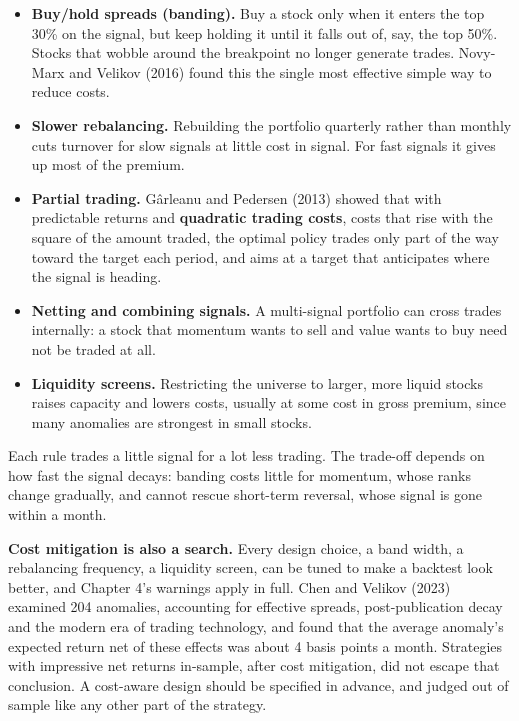 \begin{itemize}
  \item \textbf{Buy/hold spreads (banding).} Buy a stock only when it enters the top 30\% on the signal, but keep holding it until it falls out of, say, the top 50\%. Stocks that wobble around the breakpoint no longer generate trades. Novy-Marx and Velikov (2016) found this the single most effective simple way to reduce costs.
  \item \textbf{Slower rebalancing.} Rebuilding the portfolio quarterly rather than monthly cuts turnover for slow signals at little cost in signal. For fast signals it gives up most of the premium.
  \item \textbf{Partial trading.} G\^arleanu and Pedersen (2013) showed that with predictable returns and \textbf{quadratic trading costs}, costs that rise with the square of the amount traded, the optimal policy trades only part of the way toward the target each period, and aims at a target that anticipates where the signal is heading.
  \item \textbf{Netting and combining signals.} A multi-signal portfolio can cross trades internally: a stock that momentum wants to sell and value wants to buy need not be traded at all.
  \item \textbf{Liquidity screens.} Restricting the universe to larger, more liquid stocks raises capacity and lowers costs, usually at some cost in gross premium, since many anomalies are strongest in small stocks.
\end{itemize}

Each rule trades a little signal for a lot less trading. The trade-off depends on how fast the signal decays: banding costs little for momentum, whose ranks change gradually, and cannot rescue short-term reversal, whose signal is gone within a month.

\textbf{Cost mitigation is also a search.} Every design choice, a band width, a rebalancing frequency, a liquidity screen, can be tuned to make a backtest look better, and Chapter 4's warnings apply in full. Chen and Velikov (2023) examined 204 anomalies, accounting for effective spreads, post-publication decay and the modern era of trading technology, and found that the average anomaly's expected return net of these effects was about 4 basis points a month. Strategies with impressive net returns in-sample, after cost mitigation, did not escape that conclusion. A cost-aware design should be specified in advance, and judged out of sample like any other part of the strategy.

